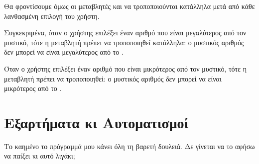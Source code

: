 \documentclass[a4paper,11pt,oneside]{book}
\begin{document}
Θα φροντίσουμε όμως οι μεταβλητές  και  να τροποποιούνται κατάλληλα μετά από κάθε λανθασμένη επιλογή του χρήστη. 

Συγκεκριμένα, όταν ο χρήστης επιλέξει έναν αριθμό  που είναι μεγαλύτερος από τον μυστικό, τότε η μεταβλητή  πρέπει να τροποποιηθεί κατάλληλα: ο μυστικός αριθμός δεν μπορεί να είναι μεγαλύτερος από το . 


Όταν ο χρήστης επιλέξει έναν αριθμό  που είναι μικρότερος από τον μυστικό, τότε η μεταβλητή  πρέπει να τροποποιηθεί: ο μυστικός αριθμός δεν μπορεί να είναι μικρότερος από το .



\section{Εξαρτήματα κι Αυτοματισμοί}

\begin{question}
Το καημένο το πρόγραμμά μου κάνει όλη τη βαρετή δουλειά. Δε γίνεται να το αφήσω να παίξει κι αυτό λιγάκι; 
\end{question}
\end{document}
